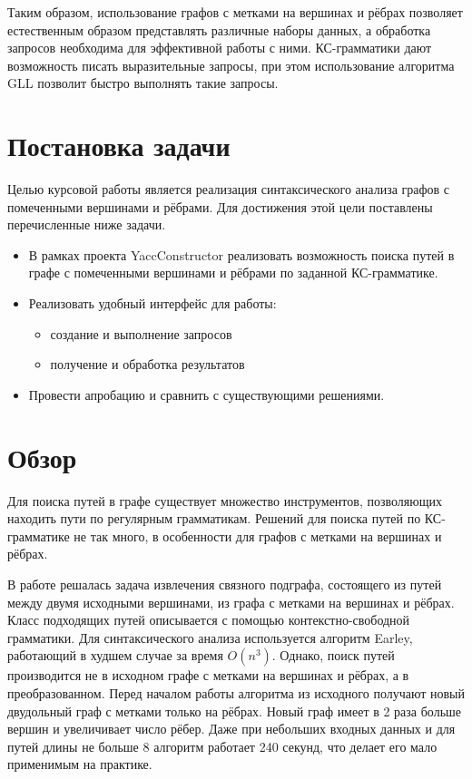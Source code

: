 \documentclass[14pt]{matmex-diploma}
\begin{document}
    Таким образом, использование графов с метками на вершинах и рёбрах позволяет естественным образом представлять различные наборы данных, а обработка запросов необходима для эффективной работы с ними. КС-грамматики дают возможность писать выразительные запросы, при этом использование алгоритма GLL позволит быстро выполнять такие запросы.
\section{Постановка задачи}
Целью курсовой работы является реализация синтаксического анализа графов с помеченными вершинами и рёбрами. Для достижения этой цели поставлены перечисленные ниже задачи.
\begin{itemize}
    \item В рамках проекта YaccConstructor \cite{YaccConstructorPage} реализовать возможность поиска путей в графе с помеченными вершинами и рёбрами по заданной КС-грамматике.
    \item Реализовать удобный интерфейс для работы:
    \begin{itemize}
    \item создание и выполнение запросов 
    \item получение и обработка результатов
    \end{itemize}
    \item Провести апробацию и сравнить с существующими решениями.
\end{itemize}

\section{Обзор}
Для поиска путей в графе существует множество инструментов, позволяющих находить пути по регулярным грамматикам. Решений для поиска путей по КС-грамматике не так много, в особенности для графов с метками на вершинах и рёбрах.
 
В работе \cite{subgraph} решалась задача извлечения связного подграфа, состоящего из путей между двумя исходными вершинами, из графа с метками на вершинах и рёбрах. Класс подходящих путей описывается с помощью контекстно-свободной грамматики. Для синтаксического анализа используется алгоритм Earley, работающий в худшем случае за время $O(n^3)$. Однако, поиск путей производится не в исходном графе с метками на вершинах и рёбрах, а в преобразованном. Перед началом работы алгоритма из исходного получают новый двудольный граф с метками только на рёбрах. Новый граф имеет в 2 раза больше вершин и увеличивает число рёбер. Даже при небольших входных данных и для путей длины не больше 8 алгоритм работает 240 секунд, что делает его мало применимым на практике.
\end{document}
